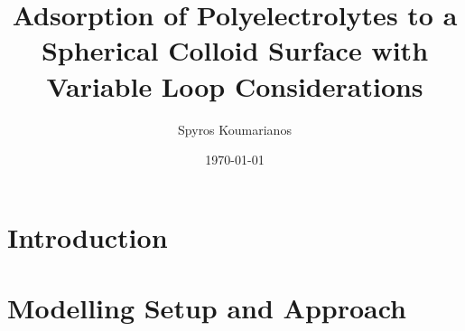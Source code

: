 \documentclass[12pt,letterpaper]{article}
\title{Adsorption of Polyelectrolytes to a Spherical Colloid Surface with Variable Loop Considerations}
\author{Spyros Koumarianos}
\date{\today}
\begin{document}
\maketitle
\begin{abstract}
\lipsum[1]
\end{abstract}
%
\tableofcontents
%


\newpage

\section{Introduction}
%
\lipsum[15-18]
%













\newpage
\section{Modelling Setup and Approach}
\end{document}
